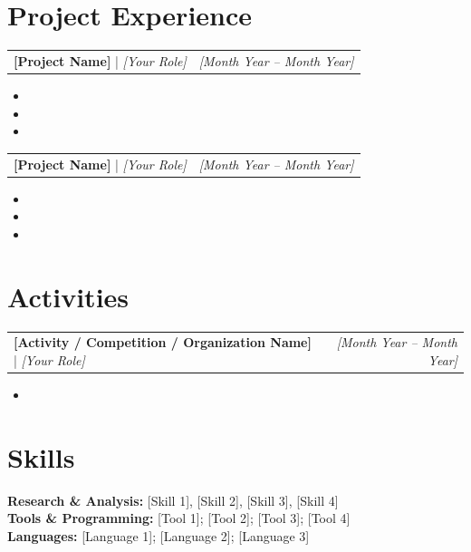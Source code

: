 \documentclass[10pt,a4paper]{article}
\makeatletter
\newcommand{\subheading}[4]{
    \begin{tabular*}{\textwidth}{@{}l@{\extracolsep{\fill}}r}
        \textbf{#1} | \textit{#3} #2 & \textit{#4} \\
    \end{tabular*}
}
\makeatother
\begin{document}
	\vspace{0.2em}
	
	\section*{Project Experience}
	
	\subheading
	{[Project Name]}
	{}
	{[Your Role]}
	{[Month Year -- Month Year]}
		\begin{itemize}[leftmargin=2em]
			    \item %
			    \item %
			    \item %
		\end{itemize}
	
	\vspace{0.5em}
	
	\subheading
	{[Project Name]}
	{}
	{[Your Role]}
	{[Month Year -- Month Year]}
		\begin{itemize}[leftmargin=2em]
			    \item %
			    \item %
			    \item %
		\end{itemize}
	
	\vspace{0.2em}
	
	\section*{Activities}
	
	\subheading
	{[Activity / Competition / Organization Name]}
	{}
	{[Your Role]}
	{[Month Year -- Month Year]}
		\begin{itemize}[leftmargin=2em]
		    \item %
		\end{itemize}
	
	\vspace{0.5em}
	
	\section*{Skills}
	
	\textbf{Research \& Analysis:} [Skill 1], [Skill 2], [Skill 3], [Skill 4]\\[0.3em]
	\textbf{Tools \& Programming:} [Tool 1]; [Tool 2]; [Tool 3]; [Tool 4]\\[0.3em]
	\textbf{Languages:} [Language 1]; [Language 2]; [Language 3]
	\vspace{0.5em}
\end{document}
